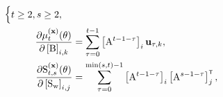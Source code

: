 \begin{align}
\begin{cases}
             t\geq 2,s\geq 2, \label{eq:J derivative A3}\\
        \end{cases}\\
        \pdv{\mu^{(\mathbf{x})}_t(\vctheta)}{\left[\mxB \right]_{i,k}} 
        &= 
        \sum_{\tau=0}^{t-1} \left[\mxA^{t-1-\tau} \right]_i \mathbf{u}_{\tau,k}, 
        \label{eq:J derivative B}\\
        \pdv{\mxS^{(\mathbf{x})}_{t,s}(\vctheta)}{\left[ \mxS_\vcw \right]_{i,j}} 
        &= 
        \sum_{\tau=0}^{\min(s,t)-1} \left[\mxA^{t-1-\tau}\right]_i \left[\mxA^{s-1-\tau}\right]_j^\tr,
        \label{eq:J derivative Sw}\\

\end{align}
